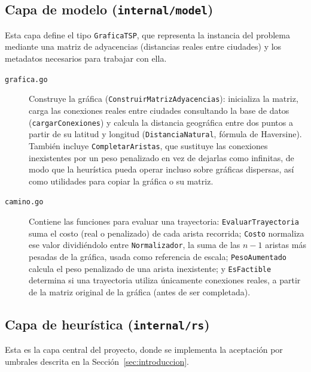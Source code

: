 \documentclass[12pt,a4paper]{article}
\begin{document}
\subsection{Capa de modelo (\texttt{internal/model})}

Esta capa define el tipo \texttt{GraficaTSP}, que representa la instancia del problema mediante una matriz de adyacencias (distancias reales entre ciudades) y los metadatos necesarios para trabajar con ella.

\begin{description}
  \item[\texttt{grafica.go}] Construye la gráfica (\texttt{ConstruirMatrizAdyacencias}): inicializa la matriz, carga las conexiones reales entre ciudades consultando la base de datos (\texttt{cargarConexiones}) y calcula la distancia geográfica entre dos puntos a partir de su latitud y longitud (\texttt{DistanciaNatural}, fórmula de Haversine). También incluye \texttt{CompletarAristas}, que sustituye las conexiones inexistentes por un peso penalizado en vez de dejarlas como infinitas, de modo que la heurística pueda operar incluso sobre gráficas dispersas, así como utilidades para copiar la gráfica o su matriz.
  \item[\texttt{camino.go}] Contiene las funciones para evaluar una trayectoria: \texttt{EvaluarTrayectoria} suma el costo (real o penalizado) de cada arista recorrida; \texttt{Costo} normaliza ese valor dividiéndolo entre \texttt{Normalizador}, la suma de las $n-1$ aristas más pesadas de la gráfica, usada como referencia de escala; \texttt{PesoAumentado} calcula el peso penalizado de una arista inexistente; y \texttt{EsFactible} determina si una trayectoria utiliza únicamente conexiones reales, a partir de la matriz original de la gráfica (antes de ser completada).
\end{description}

\subsection{Capa de heurística (\texttt{internal/rs})}

Esta es la capa central del proyecto, donde se implementa la aceptación por umbrales descrita en la Sección~\ref{sec:introduccion}.
\end{document}
